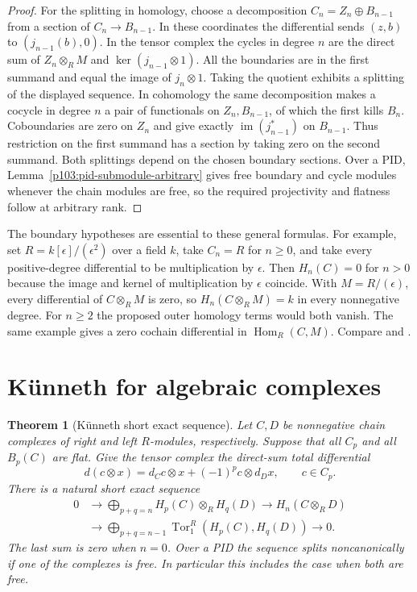 \documentclass[11pt,oneside,openany]{book}
\newtheorem{theorem}{Theorem}[chapter]
\theoremstyle{definition}
\theoremstyle{remark}
\begin{document}
\begin{proof}
For the splitting in homology, choose a decomposition
\(C_n=Z_n\oplus B_{n-1}\) from a section of \(C_n\to B_{n-1}\).
In these coordinates the differential sends
\((z,b)\) to \((j_{n-1}(b),0)\). In the tensor complex the
cycles in degree \(n\) are the direct sum of \(Z_n\otimes_R M\)
and \(\ker(j_{n-1}\otimes1)\). All the boundaries are in the
first summand and equal the image of \(j_n\otimes1\).
Taking the quotient exhibits a splitting of the displayed
sequence. In cohomology the same decomposition makes
a cocycle in degree \(n\) a pair of functionals on
\(Z_n,B_{n-1}\), of which the first kills \(B_n\).
Coboundaries are zero on \(Z_n\) and give exactly
\(\operatorname{im}(j_{n-1}^*)\) on \(B_{n-1}\).
Thus restriction on the first summand has a section by taking
zero on the second summand. Both splittings depend on the
chosen boundary sections. Over a PID,
Lemma~\ref{p103:pid-submodule-arbitrary} gives free boundary
and cycle modules whenever the chain modules are free, so the
required projectivity and flatness follow at arbitrary rank.
\end{proof}

The boundary hypotheses are essential to these general formulas.
For example, set \(R=k[\epsilon]/(\epsilon^2)\) over a field \(k\),
take \(C_n=R\) for \(n\geq0\), and take every positive-degree
differential to be multiplication by \(\epsilon\).
Then \(H_n(C)=0\) for \(n>0\) because the image and kernel of
multiplication by \(\epsilon\) coincide. With
\(M=R/(\epsilon)\), every differential of \(C\otimes_R M\)
is zero, so \(H_n(C\otimes_R M)=k\) in every nonnegative degree.
For \(n\geq2\) the proposed outer homology terms would both
vanish. The same example gives a zero cochain differential in
\(\operatorname{Hom}_R(C,M)\). Compare
\cite[Theorems 3.6.1, 3.6.2, and 3.6.5]{weibel} and
\cite[Theorems 7.55, 7.59, and Corollary 7.56]{rotman}.

\section{K\"unneth for algebraic complexes}

\begin{theorem}[K\"unneth short exact sequence]
\label{p103:ALG-10-C03-R04}
Let \(C,D\) be nonnegative chain complexes of right and left
\(R\)-modules, respectively. Suppose that all \(C_p\) and all
\(B_p(C)\) are flat. Give the tensor complex the direct-sum total
differential
\[
 d(c\otimes x)=d_Cc\otimes x+(-1)^p c\otimes d_D x,\qquad c\in C_p .
\]
There is a natural short exact sequence
\[
 \begin{split}
 0&\longrightarrow\bigoplus_{p+q=n}H_p(C)\otimes_R H_q(D)
 \longrightarrow H_n(C\otimes_R D)\\
 &\longrightarrow\bigoplus_{p+q=n-1}
   \operatorname{Tor}_1^R(H_p(C),H_q(D))\longrightarrow0 .
 \end{split}
\]
The last sum is zero when \(n=0\). Over a PID the sequence
splits noncanonically if one of the complexes is free.
In particular this includes the case when both are free.
\end{theorem}
\end{document}

